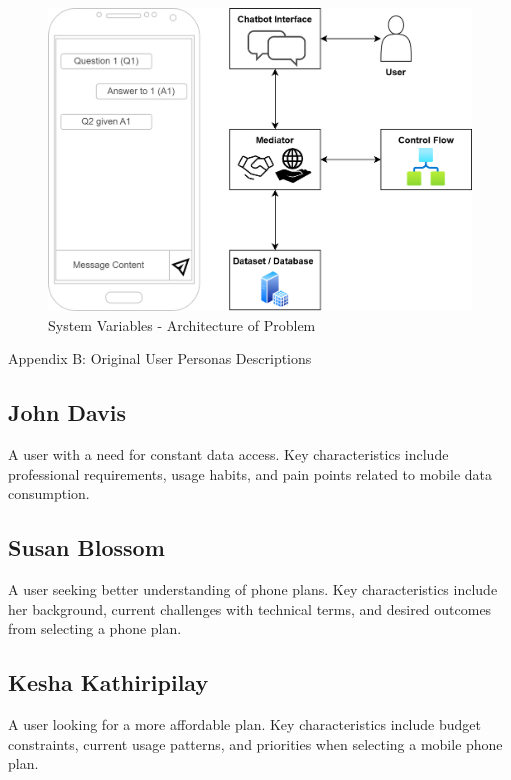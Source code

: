 \documentclass[conference]{IEEEtran}
\begin{document}
\begin{figure}[H]
    \centering
    \includegraphics[width=1\linewidth]{Wireframe_Architecture.drawio.png}
    \caption{System Variables - Architecture of Problem}
    \label{fig:system-architecture}
\end{figure}
Appendix B: Original User Personas Descriptions
\subsection{John Davis}
A user with a need for constant data access. Key characteristics include professional requirements, usage habits, and pain points related to mobile data consumption.

\subsection{Susan Blossom}
A user seeking better understanding of phone plans. Key characteristics include her background, current challenges with technical terms, and desired outcomes from selecting a phone plan.

\subsection{Kesha Kathiripilay}
A user looking for a more affordable plan. Key characteristics include budget constraints, current usage patterns, and priorities when selecting a mobile phone plan.
\end{document}
